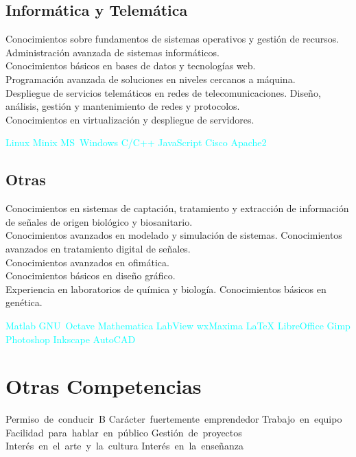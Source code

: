 \documentclass[11pt,a4paper,sans,spanish]{moderncv}
\begin{document}
\subsection{Informática y Telemática}
Conocimientos sobre fundamentos de sistemas operativos y gestión de recursos.
Administración avanzada de sistemas informáticos.
\protect\\[0.3em]
Conocimientos básicos en bases de datos y tecnologías web.
\protect\\[0.3em]
Programación avanzada de soluciones en niveles cercanos a máquina.
\protect\\[0.3em]
Despliegue de servicios telemáticos en redes de telecomunicaciones. Diseño, análisis, gestión y mantenimiento de redes y protocolos.
\protect\\[0.3em]
Conocimientos en virtualización y despliegue de servidores.

\begin{center}
\textcolor{cyan}{
Linux \quad{} Minix \quad{} MS~Windows \quad{} C/C++ \quad{} JavaScript \quad{} Cisco \quad{} Apache2 
}
\end{center}

\subsection{Otras}
Conocimientos en sistemas de captación, tratamiento y extracción de información de señales de origen biológico y biosanitario.
\protect\\[0.3em]
Conocimientos avanzados en modelado y simulación de sistemas.
Conocimientos avanzados en tratamiento digital de señales.
\protect\\[0.3em]
Conocimientos avanzados en ofimática.
\protect\\[0.3em]
Conocimientos básicos en diseño gráfico.
\protect\\[0.3em]
Experiencia en laboratorios de química y biología.
Conocimientos básicos en genética.

\begin{center}
\textcolor{cyan}{
Matlab \quad{} GNU~Octave \quad{} Mathematica \quad{} LabView \quad{} wxMaxima \quad{} LaTeX \quad{} LibreOffice \quad{} Gimp \quad{} Photoshop \quad{} Inkscape \quad{} AutoCAD
}
\end{center}


\section{Otras Competencias}
\begin{center}
Permiso~de~conducir~B \quad{} Carácter~fuertemente~emprendedor \quad{} Trabajo~en~equipo \quad{} Facilidad~para~hablar~en~público \quad{} Gestión~de~proyectos \quad{} Interés~en~el~arte~y~la~cultura \quad{} Interés~en~la~enseñanza
\end{center}
\end{document}
